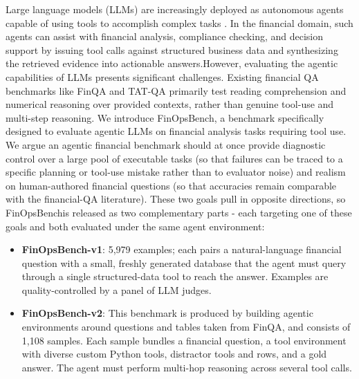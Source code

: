 \documentclass[11pt]{article}
\newcommand{\editN}[1]{\textcolor{editgreen}{#1}}
\newcommand{\datasetname}{FinOpsBench}\xspace
\newcommand{\synthsubset}{FinOpsBench-v1}\xspace
\newcommand{\groundedfinqa}{FinOpsBench-v2}\xspace
\begin{document}
Large language models (LLMs) are increasingly deployed as autonomous agents capable of using tools to accomplish complex tasks \citep{Schick2023ToolformerLM, qin2023toolllm}. In the financial domain, such agents can assist with financial analysis, compliance checking, and decision support by issuing tool calls against structured business data and synthesizing the retrieved evidence into actionable answers.However, evaluating the agentic capabilities of LLMs presents significant challenges. Existing financial QA benchmarks like FinQA \citep{chen2021finqa} and TAT-QA \citep{zhu-etal-2021-tat} primarily test reading comprehension and numerical reasoning over provided contexts, rather than genuine tool-use and multi-step reasoning. 
We introduce \datasetname, a benchmark specifically designed to evaluate agentic LLMs on financial analysis tasks requiring tool use. \editN{We argue an agentic financial benchmark should at once provide diagnostic control over a large pool of executable tasks (so that failures can be traced to a specific planning or tool-use mistake rather than to evaluator noise) and realism on human-authored financial questions (so that accuracies remain comparable with the financial-QA literature). These two goals pull in opposite directions, so \datasetname is released as two complementary parts - each targeting one of these goals and both evaluated under the same agent environment:}

\begin{itemize}
    \item \textbf{\synthsubset}: \editN{5,979 examples; each pairs a natural-language financial question with a small, freshly generated database that the agent must query through a single structured-data tool to reach the answer. Examples are quality-controlled by a panel of LLM judges.}
    
    \item \textbf{\groundedfinqa}: This benchmark is produced by building agentic environments around questions and tables taken from FinQA, and consists of 1,108 samples. Each sample bundles a financial question, a tool environment with diverse custom Python tools, distractor tools and rows, and a gold answer. The agent must perform multi-hop reasoning across several tool calls.
\end{itemize}
\end{document}
